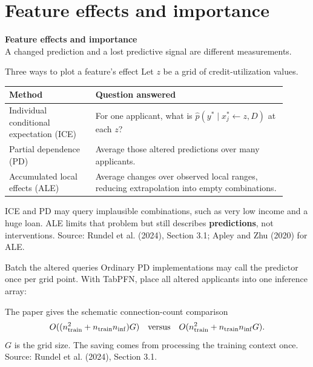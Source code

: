 \documentclass[aspectratio=169]{beamer}
\begin{document}
\section{Feature effects and importance}
\begin{frame}[plain]
  \vfill\centering
  {\Large\color{popblue}\textbf{Feature effects and importance}}\\[9pt]
  {\small A changed prediction and a lost predictive signal are different measurements.}
  \vfill
\end{frame}

\begin{frame}{Three ways to plot a feature's effect}
  \small
  Let $z$ be a grid of credit-utilization values.
  \vskip 8pt
  \begin{tabular}{L{0.29\linewidth}L{0.62\linewidth}}
    \textbf{Method} & \textbf{Question answered}\\[3pt]\hline
    Individual conditional expectation (ICE) & For one applicant, what is
      $\hat p(y^*\mid x^*_{j}\!\leftarrow\! z,D)$ at each $z$?\\[5pt]
    Partial dependence (PD) & Average those altered predictions over many applicants.\\[5pt]
    Accumulated local effects (ALE) & Average changes over observed local ranges,
      reducing extrapolation into empty combinations.
  \end{tabular}
  \vskip 9pt
  ICE and PD may query implausible combinations, such as very low income and a huge
  loan. ALE limits that problem but still describes \textbf{predictions}, not interventions.
  \vskip 4pt
  {\scriptsize Source: Rundel et al. (2024), Section 3.1; Apley and Zhu (2020) for ALE.}
\end{frame}

\begin{frame}{Batch the altered queries}
  \small
  Ordinary PD implementations may call the predictor once per grid point.
  With TabPFN, place all altered applicants into one inference array:
  \vskip 10pt
  \begin{center}
  \end{center}
  \vskip 10pt
  The paper gives the schematic connection-count comparison
  \[O((n_{\rm train}^{2}+n_{\rm train}n_{\rm inf})G)
    \quad\hbox{versus}\quad
    O(n_{\rm train}^{2}+n_{\rm train}n_{\rm inf}G).\]
  $G$ is the grid size. The saving comes from processing the training context once.
  \vskip 3pt
  {\scriptsize Source: Rundel et al. (2024), Section 3.1.}
\end{frame}
\end{document}
